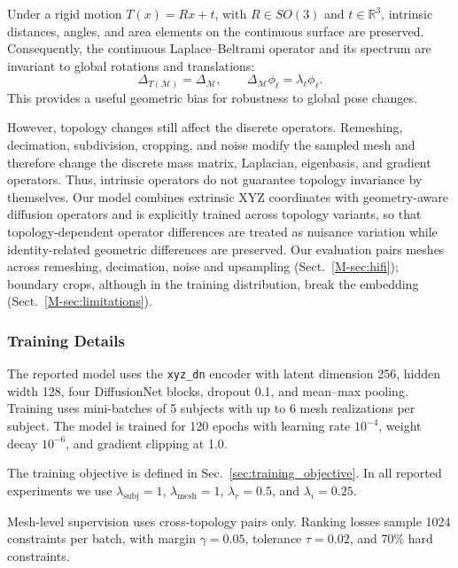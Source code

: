 Under a rigid motion $T(x)=Rx+t$, with $R\in SO(3)$ and $t\in\mathbb{R}^3$, intrinsic distances, angles, and area elements on the continuous surface are preserved. Consequently, the continuous Laplace--Beltrami operator and its spectrum are invariant to global rotations and translations:
\begin{equation}
\Delta_{T(\mathcal{M})}=\Delta_{\mathcal{M}},
\qquad
\Delta_{\mathcal{M}}\phi_\ell=\lambda_\ell\phi_\ell.
\end{equation}
This provides a useful geometric bias for robustness to global pose changes.

However, topology changes still affect the discrete operators. Remeshing,
decimation, subdivision, cropping, and noise modify the sampled mesh and
therefore change the discrete mass matrix, Laplacian, eigenbasis, and gradient
operators. Thus, intrinsic operators do not guarantee topology invariance by
themselves. Our model combines extrinsic XYZ coordinates with geometry-aware
diffusion operators and is explicitly trained across topology variants, so that
topology-dependent operator differences are treated as nuisance variation while
identity-related geometric differences are preserved. Our evaluation pairs meshes
across remeshing, decimation, noise and upsampling (Sect.~\ref{M-sec:hifi});
boundary crops, although in the training distribution, break the embedding
(Sect.~\ref{M-sec:limitations}).

\subsubsection{Training Details}
\label{app:training_details}

The reported model uses the \texttt{xyz\_dn} encoder with latent dimension 256,
hidden width 128, four DiffusionNet blocks, dropout 0.1, and mean--max pooling.
Training uses mini-batches of 5 subjects with up to 6 mesh realizations per
subject. The model is trained for 120 epochs with learning rate $10^{-4}$,
weight decay $10^{-6}$, and gradient clipping at 1.0.

The training objective is defined in Sec.~\ref{sec:training_objective}. In all
reported experiments we use $\lambda_{\mathrm{subj}}=1$,
$\lambda_{\mathrm{mesh}}=1$, $\lambda_r=0.5$, and $\lambda_i=0.25$.

Mesh-level supervision uses cross-topology pairs only. Ranking losses sample
1024 constraints per batch, with margin $\gamma=0.05$, tolerance $\tau=0.02$,
and 70\% hard constraints.

